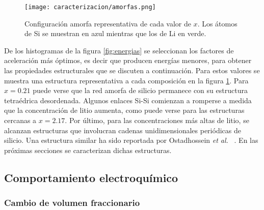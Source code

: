 \begin{figure}[t]
    \centering
    \texttt{[image: caracterizacion/amorfas.png]}
    \caption{Configuración amorfa representativa de cada valor de $x$. Los átomos
    de Si se muestran en azul mientras que los de Li en verde.}
    \label{fig:amorfas}
\end{figure}
De los histogramas de la figura \ref{fig:energias} se seleccionan los factores 
de aceleración más óptimos, es decir que producen energías menores, para obtener
las propiedades estructurales que se discuten a continuación. Para estos valores
se muestra una estructura representativa a cada composición en la figura 
\ref{fig:amorfas}. Para $x = 0.21$ puede verse que la red amorfa de silicio
permanece con su estructura tetraédrica desordenada. Algunos enlaces Si-Si 
comienzan a romperse a medida que la concentración de litio aumenta, como puede
verse para las estructuras cercanas a $x = 2.17$. Por último, para las 
concentraciones más altas de litio, se alcanzan estructuras que involucran 
cadenas unidimensionales periódicas de silicio. Una estructura similar ha sido 
reportada por Ostadhossein \textit{et al.} ~\cite{ostadhossein2015}. En las 
próximas secciones se caracterizan dichas estructuras.

\subsection{Comportamiento electroquímico}

\subsubsection{Cambio de volumen fraccionario}

